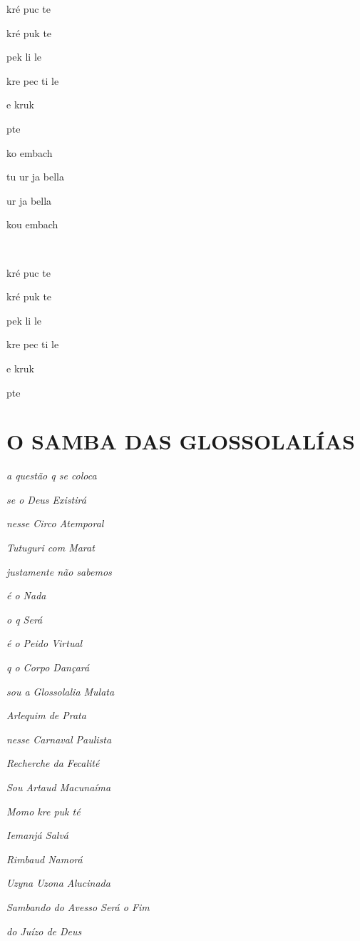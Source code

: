 \begin{center}
kré puc te

kré puk te

pek li le

kre pec ti le

e kruk

pte

ko embach

tu ur ja bella

ur ja bella

kou embach

~

kré puc te

kré puk te

pek li le

kre pec ti le

e kruk

pte
\end{center}

\pagebreak


\section*{O SAMBA DAS GLOSSOLALÍAS}

\emph{a questão q se coloca}

\emph{se o Deus Existirá}

\emph{nesse Circo Atemporal}

\emph{Tutuguri com Marat}

\emph{justamente não sabemos}

\emph{é o Nada}

\emph{o q Será}

\emph{é o Peido Virtual}

\emph{q o Corpo Dançará}

\emph{sou a Glossolalia Mulata}

\emph{Arlequim de Prata}

\emph{nesse Carnaval Paulista}

\emph{Recherche da Fecalité}

\emph{Sou Artaud Macunaíma}

\emph{Momo kre puk té}

\emph{Iemanjá Salvá}

\emph{Rimbaud Namorá}

\emph{Uzyna Uzona Alucinada}

\emph{Sambando do Avesso Será o Fim}

\emph{do Juízo de Deus}

